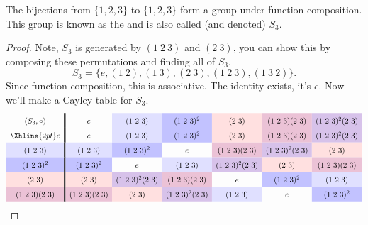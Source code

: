 \documentclass{ximera}
\begin{document}
\begin{example}
  The bijections from $\{1,2,3\}$ to $\{1,2,3\}$ form a group under
  function composition. This group is known as the  and is also called (and denoted) $S_3$.
  \begin{proof}
    Note, $S_3$ is generated by $(1\ 2\ 3)$ and $(2\ 3)$, you can show
    this by composing these permutations and finding all of $S_3$,
    \[
    S_3 = \{e,(1\ 2),(1\ 3), (2\ 3), (1 \ 2 \ 3), (1 \ 3 \ 2)\}. 
    \]
    Since function composition, this is associative. The identity
    exists, it's $e$. Now we'll make a Cayley table for $S_3$.
    \begin{gather*}
      \renewcommand{\arraystretch}{1.6}
      \begin{array}{c!{\vline width 2pt}cccccc}
        (S_3,\circ)& e     & (1\ 2\ 3)\cellcolor{blue!12!white}     & (1\ 2\ 3)^2\cellcolor{blue!24!white}   & (2\ 3) \cellcolor{red!12!white}    & (1\ 2\ 3) (2\ 3) \cellcolor{blue!33!red!24!white}  & (1\ 2\ 3)^2 (2\ 3)\cellcolor{blue!66!red!24!white} \\  \Xhline{2pt}
        e          & e     & (1\ 2\ 3)\cellcolor{blue!12!white}    & (1\ 2\ 3)^2\cellcolor{blue!24!white}   & (2\ 3) \cellcolor{red!12!white}    & (1\ 2\ 3) (2\ 3) \cellcolor{blue!33!red!24!white}   & (1\ 2\ 3)^2(2\ 3) \cellcolor{blue!66!red!24!white} \\  
        (1\ 2\ 3)\cellcolor{blue!12!white}         & (1\ 2\ 3)\cellcolor{blue!12!white}    & (1\ 2\ 3)^2\cellcolor{blue!24!white}   & e     & (1\ 2\ 3)(2\ 3)\cellcolor{blue!33!red!24!white} & (1\ 2\ 3)^2(2\ 3) \cellcolor{blue!66!red!24!white}    & (2\ 3) \cellcolor{red!12!white}   \\  
        (1\ 2\ 3)^2\cellcolor{blue!24!white}        & (1\ 2\ 3)^2\cellcolor{blue!24!white}   & e     & (1\ 2\ 3)\cellcolor{blue!12!white}    & (1\ 2\ 3)^2 (2\ 3) \cellcolor{blue!66!red!24!white}   & (2\ 3) \cellcolor{red!12!white} & (1\ 2\ 3)(2\ 3) \cellcolor{blue!33!red!24!white}    \\  
        (2\ 3) \cellcolor{red!12!white}         & (2\ 3) \cellcolor{red!12!white}    & (1\ 2\ 3)^2(2\ 3) \cellcolor{blue!66!red!24!white}   & (1\ 2\ 3) (2\ 3) \cellcolor{blue!33!red!24!white} & e     & (1\ 2\ 3)^2\cellcolor{blue!24!white}    & (1\ 2\ 3)\cellcolor{blue!12!white}   \\  
        (1\ 2\ 3) (2\ 3) \cellcolor{blue!33!red!24!white}        & (1\ 2\ 3)(2\ 3) \cellcolor{blue!33!red!24!white}   & (2\ 3) \cellcolor{red!12!white} & (1\ 2\ 3)^2(2\ 3) \cellcolor{blue!66!red!24!white}    & (1\ 2\ 3)\cellcolor{blue!12!white}   & e     & (1\ 2\ 3)^2\cellcolor{blue!24!white}    \\  

\end{array}
\end{gather*}
\end{proof}
\end{example}
\end{document}
